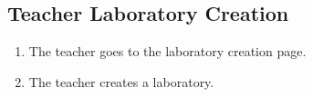 \subsection{Teacher Laboratory Creation}

\begin{enumerate}
    \item The teacher goes to the laboratory creation page.
    \item The teacher creates a laboratory.
\end{enumerate}
